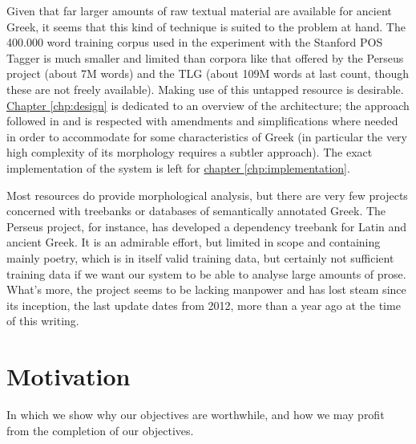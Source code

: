 Given that far larger amounts of raw textual material are available
for ancient Greek, it seems that this kind of technique is suited to
the problem at hand. The 400.000 word training corpus used in the
experiment with the Stanford POS Tagger is much smaller and limited
than corpora like that offered by the Perseus project (about 7M words)
and the TLG (about 109M words at last count, though these are not
freely available). Making use of this untapped resource is
desirable. \hyperref[chp:design]{Chapter \ref*{chp:design}} is
dedicated to an overview of the architecture; the approach followed in
\citet{collobert-2011} and \citet{turian2010word} is respected with
amendments and simplifications where needed in order to accommodate
for some characteristics of Greek (in particular the very high
complexity of its morphology requires a subtler approach). The exact
implementation of the system is left for
\hyperref[chp:implementation]{chapter \ref*{chp:implementation}}.

Most resources do provide morphological analysis, but there are very
few projects concerned with treebanks or databases of semantically
annotated Greek. The Perseus project, for instance, has developed a
dependency treebank for Latin and ancient Greek. It is an admirable
effort, but limited in scope and containing mainly poetry, which is in
itself valid training data, but certainly not sufficient training data
if we want our system to be able to analyse large amounts of prose.
What's more, the project seems to be lacking manpower and has lost
steam since its inception, the last update dates from 2012, more than
a year ago at the time of this writing.
\section{Motivation}
In which we show why our objectives are worthwhile, and how we may
profit from the completion of our objectives.

